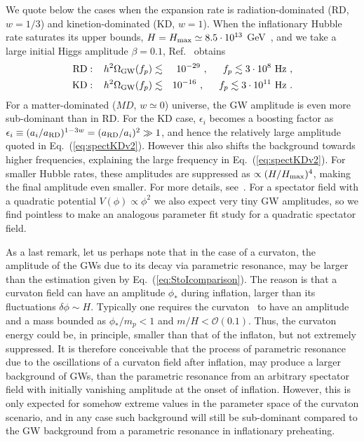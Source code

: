 \documentclass[a4paper,11pt]{article}
\newcommand{\bea}{\begin{eqnarray}}
\newcommand{\eea}{\end{eqnarray}}
\begin{document}
We quote below the cases when the expansion rate is radiation-dominated (RD, $w = 1/3$) and kinetion-dominated (KD, $w = 1$). When the inflationary Hubble rate saturates its upper bounds, $H = H_{\rm max} \simeq 8.5\cdot 10^{13}$ GeV~\cite{Ade:2015xua}, and we take a large initial Higgs amplitude $\beta = 0.1$, Ref.~\cite{Figueroa:2016ojl} obtains
\bea \label{eq:spectRD}
{\rm RD}: \,\,\,\,\, h^2 \Omega_{\rm GW} (f_p) &\lesssim & 10^{-29} \ , \,\,\,\,\,\,\,\,\, f_p \lesssim 3 \cdot 10^8 \,\,{\rm Hz} \ , \\
\label{eq:spectKDv2}
{\rm KD}: \,\,\,\,\, h^2 \Omega_{\rm GW} (f_p) &\lesssim & 10^{-16} \ , \,\,\,\,\,\,\,\,\, f_p \lesssim 3 \cdot 10^{11} \,\,{\rm Hz} \ .
\eea
For a matter-dominated ($MD$, $w \simeq 0$) universe, the GW amplitude is even more sub-dominant than in RD. For the KD case, $\epsilon_i$ becomes a boosting factor as $\epsilon_i \equiv (a_i/a_{\rm RD})^{1-3w} = (a_{\rm RD}/a_i)^2 \gg 1$, and hence the relatively large amplitude quoted in Eq.~(\ref{eq:spectKDv2}). However this also shifts the background towards higher frequencies, explaining the large frequency in Eq.~(\ref{eq:spectKDv2}). For smaller Hubble rates, these amplitudes are suppressed as $\propto (H/H_{\rm max})^4$, making the final amplitude even smaller. For more details, see~\cite{Figueroa:2016ojl}. For a spectator field with a quadratic potential $V(\phi) \propto \phi^2$ we also expect very tiny GW amplitudes, so we find pointless to make an analogous parameter fit study for a quadratic spectator field. 

As a last remark, let us perhaps note that in the case of a curvaton, the amplitude of the GWs due to its decay via parametric resonance, may be larger than the estimation given by Eq.~(\ref{eq:StoIcomparison}). The reason is that a curvaton field can have an amplitude $\phi_*$ during inflation, larger than its fluctuations $\delta \phi \sim H$. Typically one requires the curvaton~\cite{Enqvist:2001zp,Lyth:2001nq,Moroi:2001ct,Mazumdar:2010sa} to have an amplitude and a mass bounded as $\phi_*/m_p < 1$ and $m/H < \mathcal{O}(0.1)$. Thus, the curvaton energy could be, in principle, smaller than that of the inflaton, but not extremely suppressed. It is therefore conceivable that the process of parametric resonance due to the oscillations of a curvaton field after inflation, may produce a larger background of GWs, than the parametric resonance from an arbitrary spectator field with initially vanishing amplitude at the onset of inflation. However, this is only expected for somehow extreme values in the parameter space of the curvaton scenario, and in any case such background will still be sub-dominant compared to the GW background from a parametric resonance in inflationary preheating.
\end{document}
